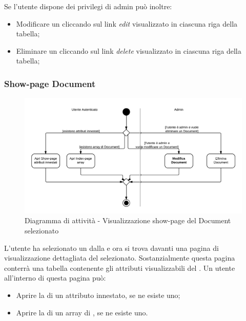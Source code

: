 Se l'utente dispone dei privilegi di admin può inoltre:

\begin{itemize}

	\item Modificare un  cliccando sul link \textit{edit} visualizzato in ciascuna riga della tabella;
	\item Eliminare un  cliccando sul link \textit{delete} visualizzato in ciascuna riga della tabella;

\end{itemize}

\subsubsection{Show-page Document}

\begin{figure}[H]
\centering
\includegraphics[scale=0.2]{uml/MaaP - Show-page.png}
\caption{Diagramma di attività - Visualizzazione show-page del Document selezionato}
\end{figure}

L'utente ha selezionato un  dalla  e ora si trova davanti una pagina di visualizzazione dettagliata del  selezionato. Sostanzialmente questa pagina conterrà una tabella contenente gli attributi visualizzabili del . Un utente all'interno di questa pagina può:

\begin{itemize}

	\item Aprire la  di un attributo innestato, se ne esiste uno;
	\item Aprire la  di un array di , se ne esiste uno.

\end{itemize}

